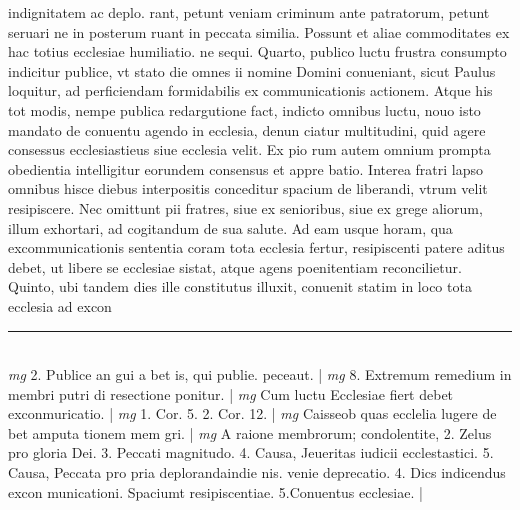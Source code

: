 \documentclass{article}
\begin{document}
\begin{pages}
indignitatem ac deplo. rant, petunt veniam criminum ante patratorum, petunt seruari ne in posterum ruant in peccata similia. Possunt et aliae commoditates ex hac totius ecclesiae humiliatio. ne sequi.  \pend\pstart Quarto, publico luctu frustra consumpto indicitur publice, vt stato die omnes ii nomine Domini conueniant, sicut Paulus loquitur, ad perficiendam formidabilis ex communicationis actionem. Atque  his tot modis, nempe publica redargutione fact, indicto omnibus luctu, nouo isto mandato de conuentu agendo in ecclesia, denun ciatur multitudini, quid agere consessus ecclesiastieus siue ecclesia velit. Ex pio rum autem omnium prompta obedientia intelligitur eorundem consensus et appre batio. Interea fratri lapso omnibus hisce diebus interpositis conceditur spacium de liberandi, vtrum velit resipiscere. Nec omittunt pii fratres, siue ex senioribus, siue ex grege aliorum, illum exhortari, ad cogitandum de sua salute. Ad eam usque  horam, qua excommunicationis sententia coram tota ecclesia fertur, resipiscenti patere aditus debet, ut libere se ecclesiae sistat, atque agens poenitentiam reconcilietur. Quinto, ubi tandem dies ille constitutus illuxit, conuenit statim in loco tota ecclesia ad excon  \pend
\vspace{0.5cm}\noindent
\vspace{0.2cm}\rule{1cm}{0.2pt}\\ 
\hspace{0.2cm}\textit{mg}
\footnotesize 2. Publice an gui a bet is, qui publie. peceaut. 
\normalsize| 
\hspace{0.2cm}\textit{mg}
\footnotesize 8. Extremum remedium in membri putri di resectione ponitur. 
\normalsize| 
\hspace{0.2cm}\textit{mg}
\footnotesize Cum luctu Ecclesiae fiert debet exconmuricatio. 
\normalsize| 
\hspace{0.2cm}\textit{mg}
\footnotesize 1. Cor. 5. 2. Cor. 12. 
\normalsize| 
\hspace{0.2cm}\textit{mg}
\footnotesize Caisseob quas ecclelia lugere de bet amputa tionem mem gri. 
\normalsize| 
\hspace{0.2cm}\textit{mg}
\footnotesize A raione membrorum; condolentite, 2. Zelus pro gloria Dei. 3. Peccati magnitudo. 4. Causa, Jeueritas iudicii ecclestastici. 5. Causa, Peccata pro pria deplorandaindie nis. venie deprecatio. 4. Dics indicendus excon municationi. Spaciumt resipiscentiae. 5.Conuentus ecclesiae. 
\normalsize| 

\end{pages}
\end{document}
